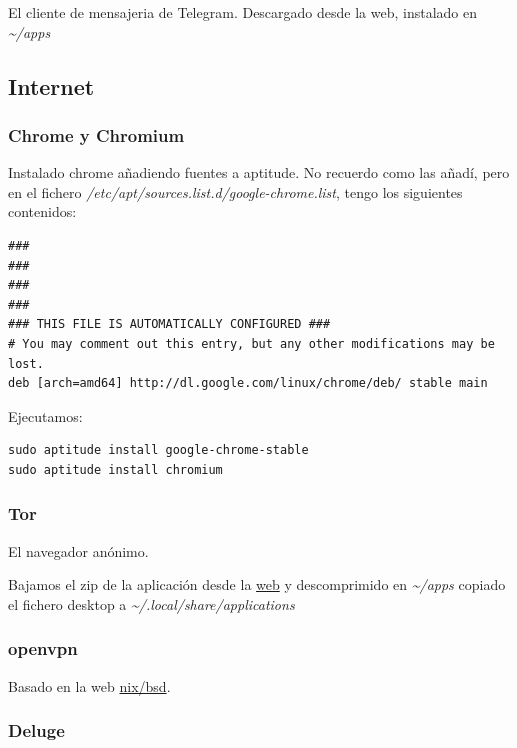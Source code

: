\documentclass[12pt,spanish,]{scrartcl}
\begin{document}
El cliente de mensajeria de Telegram. Descargado desde la web, instalado
en \emph{\textasciitilde{}/apps}

\subsection{Internet}\label{internet}

\subsubsection{Chrome y Chromium}\label{chrome-y-chromium}

Instalado chrome añadiendo fuentes a aptitude. No recuerdo como las
añadí, pero en el fichero
\emph{/etc/apt/sources.list.d/google-chrome.list}, tengo los siguientes
contenidos:

\begin{verbatim}
###
###
###
###
### THIS FILE IS AUTOMATICALLY CONFIGURED ###
# You may comment out this entry, but any other modifications may be lost.
deb [arch=amd64] http://dl.google.com/linux/chrome/deb/ stable main
\end{verbatim}

Ejecutamos:

\begin{verbatim}
sudo aptitude install google-chrome-stable
sudo aptitude install chromium
\end{verbatim}

\subsubsection{Tor}\label{tor}

El navegador anónimo.

Bajamos el zip de la aplicación desde la
\href{https://www.torproject.org}{web} y descomprimido en
\emph{\textasciitilde{}/apps} copiado el fichero desktop a
\emph{\textasciitilde{}/.local/share/applications}

\subsubsection{openvpn}\label{openvpn}

Basado en la web
\href{https://nixbsd.wordpress.com/2017/04/01/freebsd-10-2-configure-openvpn-client/}{nix/bsd}.

\subsubsection{Deluge}\label{deluge}
\end{document}
